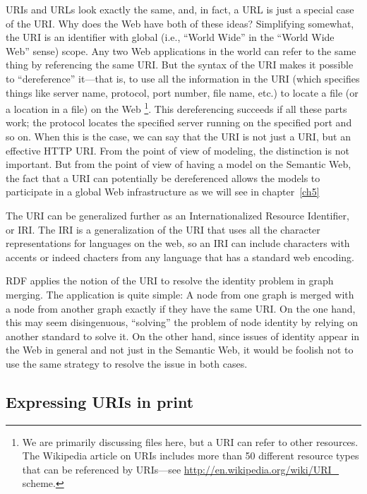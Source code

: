 URIs and URLs look exactly the same, and, in fact, a URL is just a
special case of the URI. Why does the Web have both of these ideas?
Simplifying somewhat, the URI is an identifier with global (i.e.,
``World Wide'' in the ``World Wide Web'' sense) scope. Any two Web
applications in the world can refer to the same thing by referencing the
same URI. But the syntax of the URI makes it possible to ``dereference''
it---that is, to use all the information in the URI (which specifies
things like server name, protocol, port number, file name, etc.) to
locate a file (or a location in a file) on the Web \footnote{We are primarily discussing files here, but a URI can refer to other
resources. The Wikipedia article on URIs includes more than 50 different
resource types that can be referenced by URIs---see
\url{http://en.wikipedia.org/wiki/URI_} scheme.}. This
dereferencing succeeds if all these parts work; the protocol locates the
specified server running on the specified port and so on. When this is
the case, we can say that the URI is not just a URI, but an effective
HTTP URI. From the point of view of modeling, the distinction is not
important. But from the point of view of having a model on the Semantic
Web, the fact that a URI can potentially be dereferenced allows the
models to participate in a global Web infrastructure as we will see in
chapter~\ref{ch5}

The URI can be generalized further as an Internationalized Resource Identifier, 
or IRI.  The IRI is a generalization of the URI that uses all the character representations
for languages on the web, so an IRI can include characters with accents or indeed chacters from 
any language that has a standard web encoding. 

RDF applies the notion of the URI to resolve the identity problem in
graph merging. The application is quite simple: A node from one graph is
merged with a node from another graph exactly if they have the same
URI. On the one hand, this may seem disingenuous, ``solving'' the
problem of node identity by relying on another standard to solve it. On
the other hand, since issues of identity appear in the Web in general
and not just in the Semantic Web, it would be foolish not to use the
same strategy to resolve the issue in both cases.

\subsection{Expressing URIs in print}


